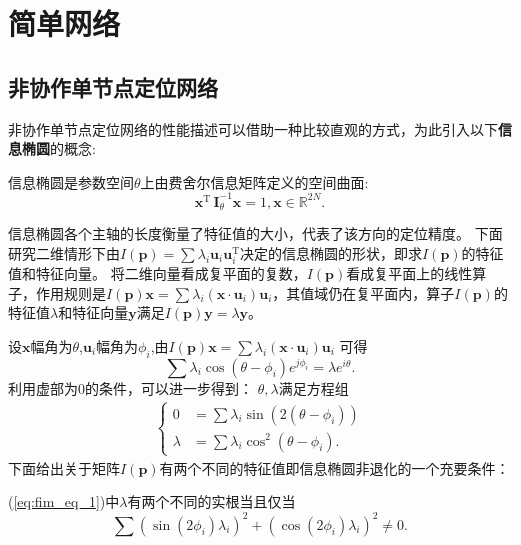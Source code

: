 \chapter{简单网络}\label{cha:content3}

\section{非协作单节点定位网络}\label{section:circle_general}
非协作单节点定位网络的性能描述可以借助一种比较直观的方式，为此引入以下\textbf{信息椭圆}的概念\cite{LimitBound}:
\begin{definition}
信息椭圆是参数空间$\theta$上由费舍尔信息矩阵定义的空间曲面:
\begin{equation}\label{eq:ie}
\bm{x}^{\textrm{T}} \,\bm{I}_{\theta}^{-1}\bm{x}=1,\bm{x}\in \mathbb{R}^{2N}.
\end{equation}
\end{definition}
信息椭圆各个主轴的长度衡量了特征值的大小，代表了该方向的定位精度。
下面研究二维情形下由$I(\bm{p})=\sum \lambda_i \bm{u}_i \bm{u}_i^{\textrm{T}} $决定的信息椭圆的形状，即求$I(\bm{p})$的特征值和特征向量。
将二维向量看成复平面的复数，$I(\bm{p})$看成复平面上的线性算子，作用规则是$I(\bm{p})\bm{x}=\sum \lambda_i (\bm{x}\cdot\bm{u}_i)\bm{u}_i$，其值域仍在复平面内，算子$I(\bm{p})$的特征值$\lambda$和特征向量$\bm{y}$满足$I(\bm{p})\bm{y}=\lambda \bm{y}$。


设$\bm{x}$幅角为$\theta$,$\bm{u}_i$幅角为$\phi_i$,由$I(\bm{p})\bm{x}=\sum \lambda_i (\bm{x}\cdot\bm{u}_i)\bm{u}_i$
可得
\begin{equation}
\sum \lambda_i \cos(\theta-\phi_i)e^{j\phi_i}=\lambda e^{i\theta}.
\end{equation}
利用虚部为0的条件，可以进一步得到：
$\theta,\lambda$满足方程组
\begin{align}\label{eq:fim_eq_1}
\begin{cases}
0&=\sum \lambda_i \sin(2(\theta-\phi_i))\\
\lambda&=\sum \lambda_i \cos^2(\theta-\phi_i).
\end{cases}
\end{align}
下面给出关于矩阵$I(\bm{p})$有两个不同的特征值即信息椭圆非退化的一个充要条件：
\begin{theorem}
(\ref{eq:fim_eq_1})中$\lambda$有两个不同的实根当且仅当
\begin{equation}
\sum (\sin(2\phi_i)\lambda_i)^2+(\cos(2\phi_i)\lambda_i)^2 \neq 0.
\end{equation}
\end{theorem}

